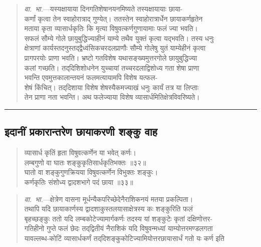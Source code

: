 \documentclass[11pt,a4paper]{article}
\newcommand{\longline}{\noindent\rule{\textwidth}{0.4pt}}
\newcommand{\dev}[1]{{\devanagarifont #1}}
\newenvironment{shloka}{%
  \begin{quote}
  \small
  \setlength{\leftmargin}{2em}
  \devanagarifont
}{\end{quote}}
\newenvironment{vyakhya}{%
  \begin{quote}
  \small
  \setlength{\leftmargin}{1em}
  \devanagarifont
}{\end{quote}}
\newcommand{\skt}[1]{{\devanagarifont #1}}
\begin{document}
\begin{vyakhya}
\textit{वा.\ भा.}—\skt{यस्यक्षायाया दिनगतिशेषानयनमिष्यते तस्यक्षायायाः छाया-}\\
\skt{कर्णां कृत्वा तेन स्वाहोरात्राद्‌ गुण्येत्। ततस्तेन स्वाहोरात्रार्धेन छायाकर्णहृतेन}\\
\skt{मताया कृता व्यासार्धकृतिः कि मृत्या विषुवत्कर्णगुणायामाः फलं ज्या भवति।}\\
\skt{सफलं सौम्ये गोले छायुबुद्धिज्याहीनं याम्ये तथैव युक्तं कृत्वा यद्‌भवति। तस्य धनुः}\\
\skt{क्षेत्राणां कार्यस्तदनुस्तद्द्वैध्वंसिकचरदलप्राणौः सौम्ये गोलेषु युतं याम्येहीनं कृत्वा}\\
\skt{प्रागपरयोः प्राणा भवति। भ्रष्टो गतविशेष यथासङ्ख्यमुत्तरगोले छायुबुद्धिज्या}\\
\skt{कलां गच्छति। तद्‌दिशिशोधनेन युच्चायां तच्चरदलाद्विशोध्य गता शेषा प्राणा}\\
\skt{भवन्ति एवमुत्तकालान्तयनं फलमत्यायामपि विशेष यत्फल-}\\
\skt{शेषं किंचित्। तद्‌दिशाया विशेष शेषस्यैकमज्याखं धनुः कार्यं तत्र या लिप्ताः}\\
\skt{तेन प्राणा नता भवन्ति। अथ फलेज्याया विशेष व्यासार्धमितिक्षेत्रविवरिष्यते।}
\end{vyakhya}

\longline

\subsection{\dev{इदानीं प्रकारान्तरेण छायाकरणी शङ्कु वाह}}

\begin{shloka}
\skt{व्यासार्ध कृतिं हृता विषुवत्कर्णेन या भवेत् कर्णः।}\\
\skt{लम्बगुणो वा घातः शङ्कुकृतिसार्धकृतिभक्तः ॥३२॥}\\[0.3em]
\skt{घातो वा शङ्कुगुणक्रियया विषुवत्कर्णेन विभुक्तः शङ्कुः।}\\
\skt{कर्णकृतिः संशोध्य द्वादशभागे पदं छाया ॥३३॥}
\end{shloka}

\begin{vyakhya}
\textit{वा.\ भा.}—\skt{क्षेत्रेण वासना मूर्धन्यैकपरिच्छेदेनैराशिकनयं मतया प्रकल्पिता।}\\
\skt{तथापि यदि छायाकार्णस्य द्वादशाकुस्तलयासाक्षेत्रस्य कः शङ्कुरिति फलं}\\
\skt{बृहच्छङ्कुः ततो यदि लम्बकोटेज्यामार्गकर्णः तदस्य यां शङ्कुटेः कृतां दक्षिणोत्तर-}\\
\skt{गतिहीनो गुप्ते फलं छेदः तद्‌द्वितीयं नैराशिकं यदि विषुवन्मध्यां याम्योत्तरमण्डलगता}\\
\skt{यावल्लब्ध-कोटिं व्यासार्धकर्णं तद्‌दिशङ्कुकोटिज्यामियोत्तरछायासार्धं गतो यः कर्ण इति}
\end{vyakhya}
\end{document}
